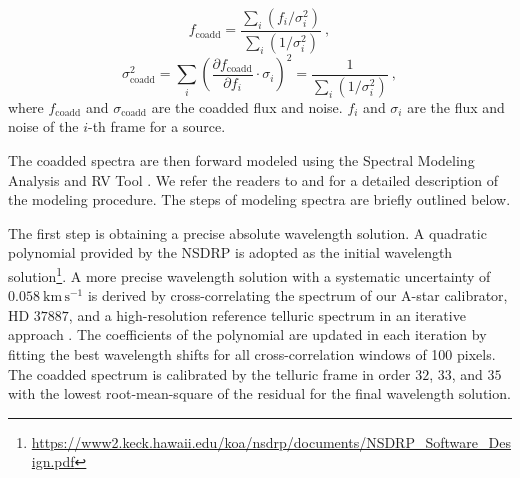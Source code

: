 \documentclass[12pt]{ucsddissertation}
\begin{document}
\begin{CJK*}{UTF8}{gbsn}
\begin{equation}
    \label{eq:flux}
    f_\mathrm{coadd} = \frac{\sum_{i}\left(f_i/\sigma_i^2\right)}{\sum_{i}\left(1/\sigma_i^2\right)}~,
\end{equation}
\begin{equation}
    \label{eq:noise}
    \sigma_\mathrm{coadd}^2 = \sum_{i}\left(\frac{\partial f_\mathrm{coadd}}{\partial f_i}\cdot\sigma_i\right)^2 = \frac{1}{\sum_{i}\left(1/\sigma_i^2\right)}~,
\end{equation}
where $f_\mathrm{coadd}$ and $\sigma_\mathrm{coadd}$ are the coadded flux and noise. $f_i$ and $\sigma_i$ are the flux and noise of the $i$-th frame for a source.

The coadded spectra are then forward modeled using the Spectral Modeling Analysis and RV Tool \citep[SMART\footnote{\url{https://github.com/chihchunhsu/smart}}, ][]{Hsu-2021-code}. We refer the readers to \citet{Hsu-2021-code, Hsu-2021-paper} and  for a detailed description of the modeling procedure. The steps of modeling spectra are briefly outlined below.

The first step is obtaining a precise absolute wavelength solution. A quadratic polynomial provided by the NSDRP is adopted as the initial wavelength solution\footnote{\url{https://www2.keck.hawaii.edu/koa/nsdrp/documents/NSDRP_Software_Design.pdf}}. A more precise wavelength solution with a systematic uncertainty of $0.058~\mathrm{km}\,\mathrm{s}^{-1}$ is derived by cross-correlating the spectrum of our A-star calibrator, HD $37887$, and a high-resolution reference telluric spectrum \citep[][]{Moehler-2014} in an iterative approach . The coefficients of the polynomial are updated in each iteration by fitting the best wavelength shifts for all cross-correlation windows of 100 pixels. The coadded spectrum is calibrated by the telluric frame in order $32$, $33$, and $35$ with the lowest root-mean-square of the residual for the final wavelength solution.


\end{CJK*}
\end{document}
